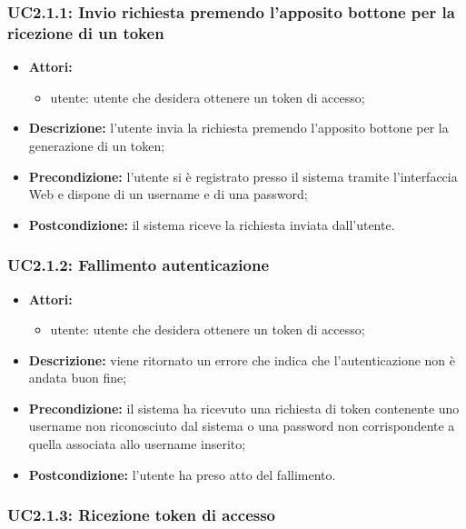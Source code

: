 \subsubsection{UC2.1.1: Invio richiesta premendo l'apposito bottone per la ricezione di un token}

\begin{itemize}
	\item \textbf{Attori:}
	\begin{itemize}
		\item utente: utente che desidera ottenere un token di accesso;
	\end{itemize}
	\item \textbf{Descrizione:} l'utente invia la richiesta premendo l'apposito bottone per la generazione di un token;
	\item \textbf{Precondizione:} l'utente si è registrato presso il sistema tramite l'interfaccia Web e dispone di un username e di una password;
	\item \textbf{Postcondizione:} il sistema riceve la richiesta inviata dall'utente.
\end{itemize}

\subsubsection{UC2.1.2: Fallimento autenticazione}

\begin{itemize}
	\item \textbf{Attori:}
	\begin{itemize}
		\item utente: utente che desidera ottenere un token di accesso;
	\end{itemize}
	\item \textbf{Descrizione:} viene ritornato un errore che indica che l'autenticazione non è andata buon fine;
	\item \textbf{Precondizione:} il sistema ha ricevuto una richiesta di token contenente uno username non riconosciuto dal sistema o una password non corrispondente a quella associata allo username inserito;
	\item \textbf{Postcondizione:} l'utente ha preso atto del fallimento.
\end{itemize}

\subsubsection{UC2.1.3: Ricezione token di accesso}


